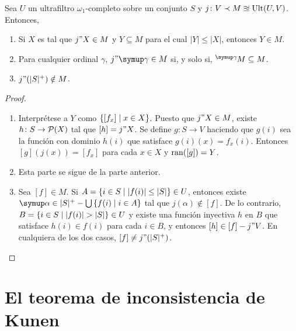 \documentclass
[
  12pt,
  letterpaper,
  openany,
  oneside,
]{book}
\begin{document}
\begin{teo}\label{teo:ultrafilters-omega1}
    Sea $U$ un ultrafiltro $\omega_1$-completo sobre un conjunto $S$ y
    $j\colon V\prec M\approxeq\operatorname{Ult}(U,V)$. Entonces,
    \begin{enumerate}[label=(\roman*)]
        \item Si $X$ es tal que $j"X\in M$ y $Y\subseteq M$ para el cual $|Y|\leq|X|$,
            entonces $Y\in M$.
        \item Para cualquier ordinal $\gamma$, $j"\gamma\in M$ si, y solo si,
            $\hbox{}^\gamma\kern-1pt M\subseteq M$.
        \item $j"(|S|^+)\notin M$.
    \end{enumerate}
\end{teo}

\begin{proof}\phantom{a}
    \begin{enumerate}[label=(\roman*)]
        \item Interprétese a $Y$ como $\left\{ [f_x]\mid x\in X \right\}$. Puesto que $j"X\in M$,
            existe $h\colon S\to\pwset{X}$ tal que $[h]=j"X$. Se define $g\colon S\to V$
            haciendo que $g(i)$ sea la función con dominio $h(i)$ que satisface
            $g(i)(x) = f_x(i)$. Entonces $[g](j(x)) = [f_x]$ para cada $x\in X$ y
            $\operatorname{ran}([g]) = Y$.
        \item Esta parte se sigue de la parte anterior.
        \item Sea $[f]\in M$. Si $A = \left\{ i\in S\mid |f(i)|\leq|S| \right\}\in U$,
            entonces existe $\alpha\in|S|^+ - \bigcup\set{f(i)\mid i\in A}$ tal que
            $j(\alpha)\notin [f]$. De lo contrario, $B=\set{i\in S\mid |f(i)|>|S|}\in U$
            y existe una función inyectiva $h$ en $B$ que satisface $h(i)\in f(i)$
            para cada $i\in B$, y entonces $[h]\in[f]-j"V$. En cualquiera de los dos casos,
            $[f]\neq j"(|S|^+)$.
    \end{enumerate}
\end{proof}

\fi
\ifmainproofs
\chapter{El teorema de inconsistencia de Kunen}
\label{cap:teorema-kunen}
\thispagestyle{empty}
\end{document}
